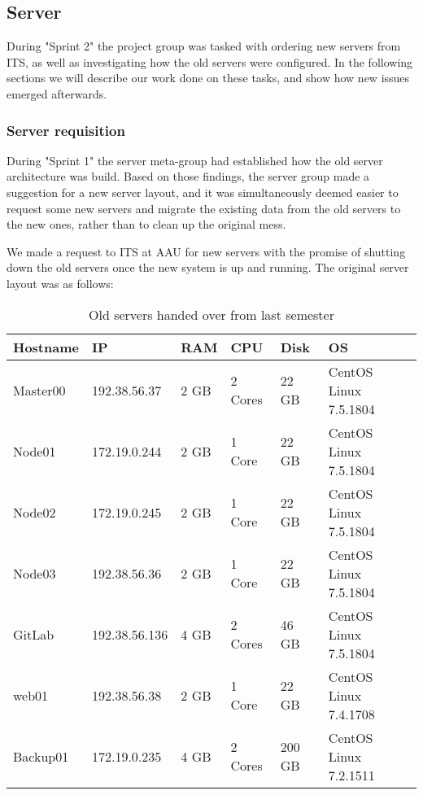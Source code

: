 \subsection{Server}\label{SEC:S2ServerWork}
During "Sprint 2" the project group was tasked with ordering new servers from ITS, as well as investigating how the old servers were configured.
In the following sections we will describe our work done on these tasks, and show how new issues emerged afterwards.

\subsubsection{Server requisition}
During "Sprint 1" the server meta-group had established how the old server architecture was build.
Based on those findings, the server group made a suggestion for a new server layout, and it was simultaneously deemed easier to request some new servers and migrate the existing data from the old servers to the new ones, rather than to clean up the original mess.

We made a request to ITS at AAU for new servers with the promise of shutting down the old servers once the new system is up and running. The original server layout was as follows:

\begin{table}[H]

\begin{tabular}{|l|l|l|l|l|l|}
\hline
Hostname 	& IP 			& RAM 	& CPU 		& Disk 		& OS 						\\ \hline
Master00 	& 192.38.56.37 	& 2 GB 	& 2 Cores 	& 22 GB 	& CentOS Linux 7.5.1804 	\\ \hline
Node01 		& 172.19.0.244 	& 2 GB 	& 1 Core 	& 22 GB 	& CentOS Linux 7.5.1804 	\\ \hline
Node02		& 172.19.0.245	& 2 GB	& 1 Core	& 22 GB		& CentOS Linux 7.5.1804		\\ \hline
Node03		& 192.38.56.36	& 2 GB	& 1 Core 	& 22 GB		& CentOS Linux 7.5.1804 	\\ \hline
GitLab 		& 192.38.56.136	& 4 GB	& 2 Cores 	& 46 GB 	& CentOS Linux 7.5.1804 	\\ \hline
web01		& 192.38.56.38	& 2 GB	& 1 Core	& 22 GB 	& CentOS Linux 7.4.1708 	\\ \hline
Backup01	& 172.19.0.235	& 4 GB	& 2 Cores	& 200 GB 	& CentOS Linux 7.2.1511 	\\ \hline
\end{tabular}
\caption{Old servers handed over from last semester}
\end{table}

